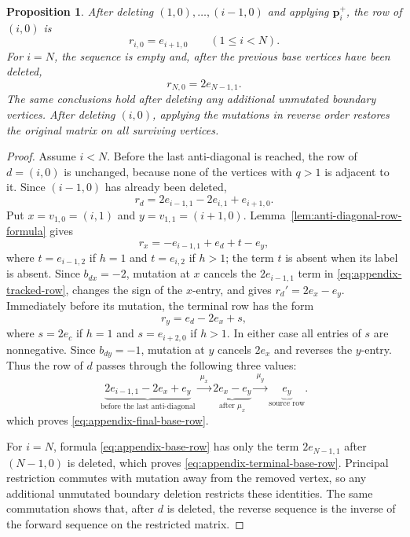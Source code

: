 \documentclass[11pt]{amsart}
\newtheorem{proposition}[theorem]{Proposition}
\theoremstyle{definition}
\theoremstyle{remark}
\begin{document}
\begin{proposition}\label{prop:triangular-mutation-sequence}
After deleting $(1,0),\ldots,(i-1,0)$ and applying
$\mathbf p_i^+$, the row of $(i,0)$ is
\begin{equation}
 r_{i,0}=e_{i+1,0}
 \qquad(1\le i<N).
 \label{eq:appendix-final-base-row}
\end{equation}
For $i=N$, the sequence is empty and, after the previous base vertices have
been deleted,
\begin{equation}
 r_{N,0}=2e_{N-1,1}.
 \label{eq:appendix-terminal-base-row}
\end{equation}
The same conclusions hold after deleting any additional unmutated boundary
vertices.  After deleting $(i,0)$, applying the mutations in reverse order
restores the original matrix on all surviving vertices.
\end{proposition}

\begin{proof}
Assume $i<N$.  Before the last anti-diagonal is reached, the row of
$d=(i,0)$ is unchanged, because none of the vertices with $q>1$ is adjacent
to it.  Since $(i-1,0)$ has already been deleted,
\begin{equation}
 r_d=2e_{i-1,1}-2e_{i,1}+e_{i+1,0}.
 \label{eq:appendix-tracked-row}
\end{equation}
Put $x=v_{1,0}=(i,1)$ and $y=v_{1,1}=(i+1,0)$.
Lemma~\ref{lem:anti-diagonal-row-formula} gives
\[ r_x=-e_{i-1,1}+e_d+t-e_y, \]
where $t=e_{i-1,2}$ if $h=1$ and $t=e_{i,2}$ if $h>1$; the term $t$ is
absent when its label is absent.  Since $b_{dx}=-2$, mutation at $x$
cancels the $2e_{i-1,1}$ term in
\eqref{eq:appendix-tracked-row}, changes the sign of the $x$-entry, and
gives
$r_d'=2e_x-e_y$.
Immediately before its mutation, the terminal row has the form
\[ r_y=e_d-2e_x+s, \]
where $s=2e_c$ if $h=1$ and $s=e_{i+2,0}$ if $h>1$.  In either case all
entries of $s$ are nonnegative.  Since $b_{dy}=-1$, mutation at $y$ cancels
$2e_x$ and reverses the $y$-entry.  Thus the row of $d$ passes through the
following three values:
\[ \underbrace{2e_{i-1,1}-2e_x+e_y}_{\text{before the last anti-diagonal}} \xrightarrow{\ \mu_x\ } \underbrace{2e_x-e_y}_{\text{after $\mu_x$}} \xrightarrow{\ \mu_y\ } \underbrace{e_y}_{\text{source row}}. \]
which proves \eqref{eq:appendix-final-base-row}.

For $i=N$, formula \eqref{eq:appendix-base-row} has only the term
$2e_{N-1,1}$ after $(N-1,0)$ is deleted, which proves
\eqref{eq:appendix-terminal-base-row}.  Principal restriction commutes with
mutation away from the removed vertex, so any additional unmutated
boundary deletion restricts these identities.  The same commutation
shows that, after $d$ is deleted, the reverse sequence is the inverse of the
forward sequence on the restricted matrix.
\end{proof}
\end{document}
